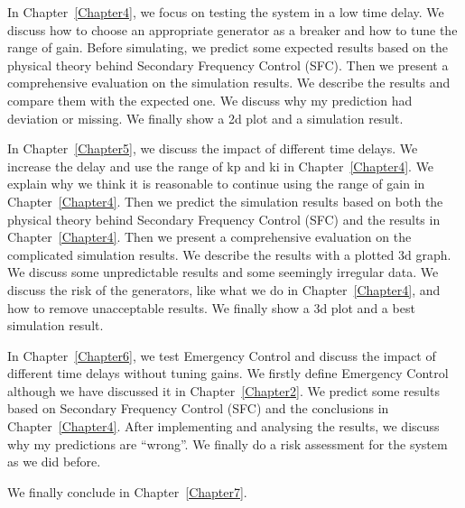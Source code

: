 \begin{description}
    \item In Chapter~\ref{Chapter4}, we focus on testing the system in a low time delay. We discuss how to choose an appropriate generator as a breaker and how to tune the range of  gain. Before simulating, we predict some expected results based on the physical theory behind Secondary Frequency Control (SFC). Then we present a comprehensive evaluation on the simulation results. We describe the results and compare them with the expected one. We discuss why my prediction had deviation or missing. We finally show a 2d plot and a simulation result.
    \item In Chapter~\ref{Chapter5}, we discuss the impact of different time delays. We increase the delay and use the range of kp and ki in Chapter~\ref{Chapter4}. We explain why we think it is reasonable to continue using the range of gain in Chapter~\ref{Chapter4}. Then we predict the simulation results based on both the physical theory behind Secondary Frequency Control (SFC) and the results in Chapter~\ref{Chapter4}. Then we present a comprehensive evaluation on the complicated simulation results. We describe the results with a plotted 3d graph. We discuss some unpredictable results and some seemingly irregular data. We discuss the risk of the generators, like what we do in Chapter~\ref{Chapter4}, and how to remove unacceptable results. We  finally show a 3d plot and a best simulation result. 
    \item In Chapter~\ref{Chapter6}, we test Emergency Control and discuss the impact of different time delays without tuning gains. We firstly define Emergency Control although we have discussed it in Chapter~\ref{Chapter2}. We predict some results based on Secondary Frequency Control (SFC) and the conclusions in Chapter~\ref{Chapter4}. After implementing and analysing the results, we discuss why my predictions are “wrong”. We finally do a risk assessment for the system as we did before.
\end{description}
We finally conclude in Chapter~\ref{Chapter7}. 